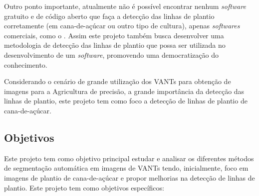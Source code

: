 \documentclass[12pt, a4paper, english, brazil]{article}
\begin{document}
Outro ponto importante, atualmente não é possível encontrar nenhum \textit{software} gratuito e de código aberto que faça a detecção das linhas de plantio corretamente (em cana-de-açúcar ou outro tipo de cultura), apenas \textit{softwares} comerciais, como o . Assim este projeto também busca desenvolver uma metodologia de detecção das linhas de plantio que possa ser utilizada no desenvolvimento de um \textit{software}, promovendo uma democratização do conhecimento.

Considerando o cenário de grande utilização dos VANTs para obtenção de imagens para a Agricultura de precisão, a grande importância da detecção das linhas de plantio, este projeto tem como foco a detecção de linhas de plantio de cana-de-açúcar.

 
\subsection{Objetivos}


Este projeto tem como objetivo principal estudar e analisar os diferentes métodos de segmentação automática em imagens de VANTs tendo, inicialmente, foco em imagens de plantio de cana-de-açúcar e propor melhorias na detecção de linhas de plantio. 
Este projeto tem como objetivos específicos:
\end{document}
